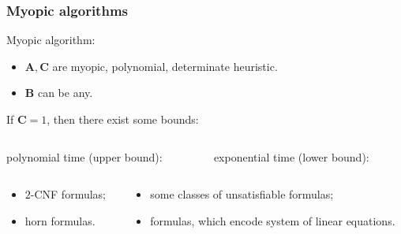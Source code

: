 \begin{frame}
    \frametitle{Myopic algorithms}

    \pause

    \begin{definition}
		Myopic algorithm:
        \begin{itemize}
            \pause
	        \item $\mathbf{A}, \mathbf{C}$ are myopic, polynomial, determinate heuristic.
            \pause
        	\item $\mathbf{B}$ can be any.
        \end{itemize}
	\end{definition}

    \pause
    If $\mathbf{C} = 1$, then there exist some bounds: 

    \pause
    \begin{columns}
        \begin{column}{5cm}
            
            polynomial time (upper bound):
        \end{column}
        \begin{column}{5cm}
            
            exponential time (lower bound):
        \end{column}
    \end{columns}

    \pause
    \begin{columns}
        \begin{column}{5cm}
            \begin{itemize}
		 		\item $2$-CNF formulas;
			    \pause
    			\item horn formulas.
            \end{itemize}
        \end{column}
        \begin{column}{5cm}
            \begin{itemize}
	            \pause
    	        \item some classes of unsatisfiable formulas;
        		\pause
            	\item formulas, which encode system of linear
		            equations.
            \end{itemize}
        \end{column}
    \end{columns}
\end{frame}

